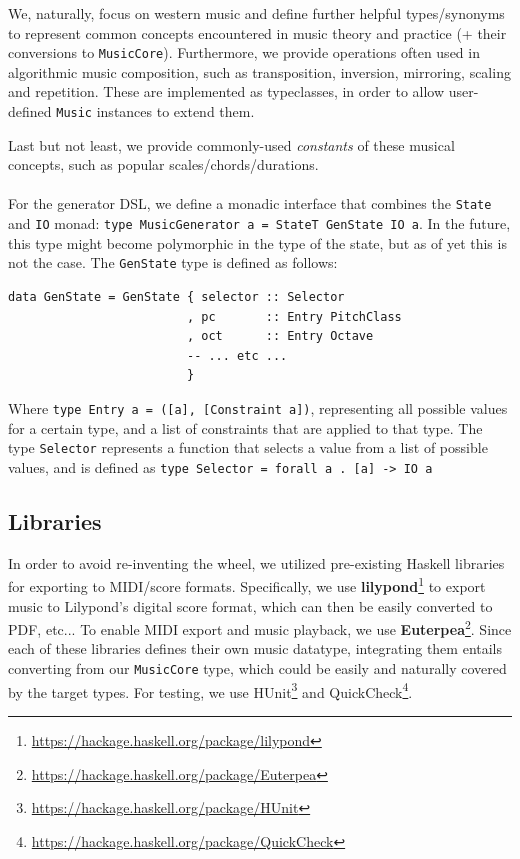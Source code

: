 \documentclass[11pt,a4paper]{article}
\newcommand{\site}[1]{\footnote{\url{#1}}}
\newcommand{\icode}[1]{\texttt{#1}}
\begin{document}
We, naturally, focus on western music and define further helpful types/synonyms to represent common concepts encountered in music theory and practice (+ their conversions to \icode{MusicCore}). Furthermore, we provide operations often used in algorithmic music composition, such as transposition, inversion, mirroring, scaling and repetition. These are implemented as typeclasses, in order to allow user-defined \icode{Music} instances to extend them.

Last but not least, we provide commonly-used \textit{constants} of these musical concepts, such as popular scales/chords/durations.
\\ \\
For the generator DSL, we define a monadic interface that combines the \icode{State} and \icode{IO} monad: \icode{type MusicGenerator a = StateT GenState IO a}. In the future, this type might become polymorphic in the type of the state, but as of yet this is not the case. The \icode{GenState} type is defined as follows:
\begin{center}\begin{minipage}{0.7\textwidth}\begin{verbatim}
data GenState = GenState { selector :: Selector
                         , pc       :: Entry PitchClass
                         , oct      :: Entry Octave
                         -- ... etc ...
                         }
\end{verbatim}
\end{minipage}
\end{center}

Where \icode{type Entry a = ([a], [Constraint a])}, representing all possible values for a certain type, and a list of constraints that are applied to that type. The type \icode{Selector} represents a function that selects a value from a list of possible values, and is defined as \icode{type Selector = forall a . [a] -> IO a}
\subsection{Libraries}
In order to avoid re-inventing the wheel, we utilized pre-existing Haskell libraries for exporting to MIDI/score formats. Specifically, we use \textbf{lilypond}\site{https://hackage.haskell.org/package/lilypond} to export music to Lilypond's digital score format, which can then be easily converted to PDF, etc... To enable MIDI export and music playback, we use \textbf{Euterpea}\site{https://hackage.haskell.org/package/Euterpea}. Since each of these libraries defines their own music datatype, integrating them entails converting from our \icode{MusicCore} type, which could be easily and naturally covered by the target types. For testing, we use HUnit\site{https://hackage.haskell.org/package/HUnit} and QuickCheck\site{https://hackage.haskell.org/package/QuickCheck}.
\end{document}
